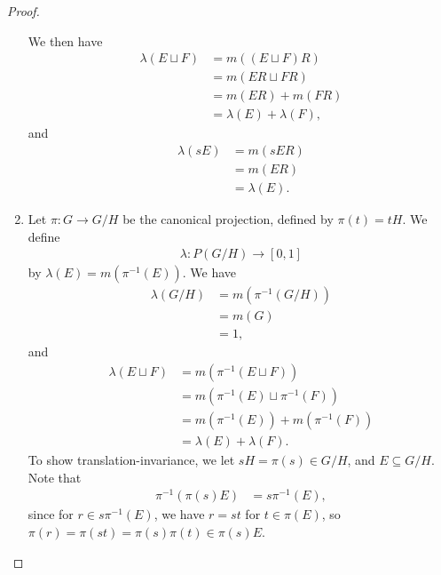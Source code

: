 \begin{proof}
\begin{enumerate}[(1)]
      We then have
      \begin{align*}
        \lambda\left(E\sqcup F\right) &= m\left(\left(E\sqcup F\right)R\right)\\
                                      &= m\left(ER\sqcup FR\right)\\
                                      &= m\left(ER\right) + m\left(FR\right)\\
                                      &= \lambda\left(E\right) + \lambda\left(F\right),
      \end{align*}
      and
      \begin{align*}
        \lambda\left(sE\right) &= m\left(sER\right)\\
                               &= m\left(ER\right)\\
                               &= \lambda\left(E\right).
      \end{align*}
    \item Let $\pi\colon G\rightarrow G/H$ be the canonical projection, defined by $\pi\left(t\right) = tH$. We define
      \begin{align*}
        \lambda\colon P\left(G/H\right) \rightarrow [0,1]
      \end{align*}
      by $\lambda(E) = m\left(\pi^{-1}\left(E\right)\right)$. We have
      \begin{align*}
        \lambda\left(G/H\right) &= m\left(\pi^{-1}\left(G/H\right)\right)\\
                                &= m\left(G\right)\\
                                &= 1,
      \end{align*}
      and
      \begin{align*}
        \lambda\left(E\sqcup F\right) &= m\left(\pi^{-1}\left(E\sqcup F\right)\right)\\
                                      &= m\left(\pi^{-1}\left(E\right)\sqcup \pi^{-1}\left(F\right)\right)\\
                                      &= m\left(\pi^{-1}\left(E\right)\right) + m\left(\pi^{-1}\left(F\right)\right)\\
                                      &= \lambda(E) + \lambda(F).
      \end{align*}
      To show translation-invariance, we let $sH = \pi(s)\in G/H$, and $E\subseteq G/H$. Note that
      \begin{align*}
        \pi^{-1}\left(\pi(s)E\right) &= s\pi^{-1}\left(E\right),
      \end{align*}
      since for $r\in s\pi^{-1}(E)$, we have $r = st$ for $t\in \pi(E)$, so $\pi\left(r\right) =\pi\left(st\right) = \pi\left(s\right)\pi\left(t\right)\in \pi\left(s\right)E$.\newline


\end{enumerate}
\end{proof}
